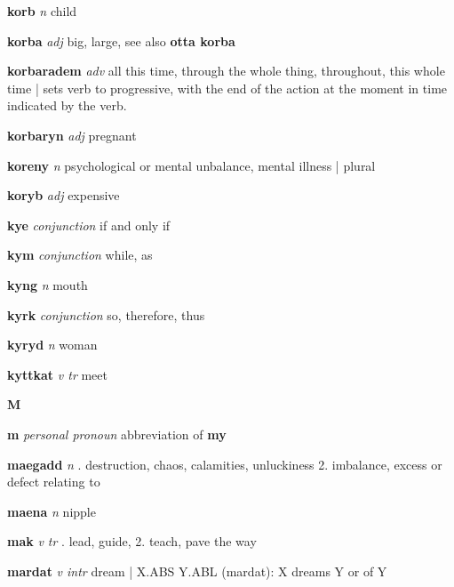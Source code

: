 \textbf{korb}   \emph{n} \textperiodcentered child

\textbf{korba}   \emph{adj} \textperiodcentered big, large, see also \textbf{otta korba}

\textbf{korbaradem}   \emph{adv} \textperiodcentered all this time, through the whole thing, throughout, this whole time | sets verb to progressive, with the end of the action at the moment in time indicated by the verb.

\textbf{korbaryn}   \emph{adj} \textperiodcentered pregnant

\textbf{koreny}   \emph{n} \textperiodcentered psychological or mental unbalance, mental illness | plural

\textbf{koryb}   \emph{adj} \textperiodcentered expensive

\textbf{kye}   \emph{conjunction} \textperiodcentered if and only if

\textbf{kym}   \emph{conjunction} \textperiodcentered while, as

\textbf{kyng}   \emph{n} \textperiodcentered mouth

\textbf{kyrk}   \emph{conjunction} \textperiodcentered so, therefore, thus

\textbf{kyryd}   \emph{n} \textperiodcentered woman

\textbf{kyttkat}   \emph{v tr} \textperiodcentered meet

\begin{center} \Huge \bfseries M \end{center}\textbf{m}   \emph{personal pronoun} \textperiodcentered abbreviation of \textbf{my}

\textbf{maegadd}   \emph{n} . destruction, chaos, calamities, unluckiness 2. imbalance, excess or defect relating to \GEN 

\textbf{maena}   \emph{n} \textperiodcentered nipple

\textbf{mak}   \emph{v tr} . lead, guide, 2. teach, pave the way 

\textbf{mardat}   \emph{v intr} \textperiodcentered dream | X.ABS Y.ABL (mardat): X dreams Y or of Y

